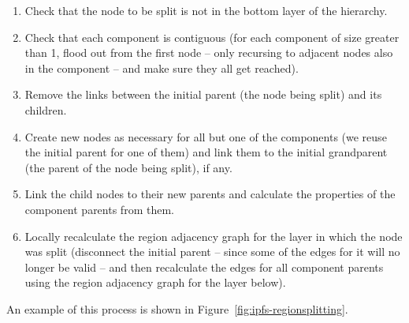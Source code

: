 \begin{enumerate}

\item Check that the node to be split is not in the bottom layer of the hierarchy.
\item Check that each component is contiguous (for each component of size greater than 1, flood out from the first node -- only recursing to adjacent nodes also in the component -- and make sure they all get reached).
\item Remove the links between the initial parent (the node being split) and its children.
\item Create new nodes as necessary for all but one of the components (we reuse the initial parent for one of them) and link them to the initial grandparent (the parent of the node being split), if any.
\item Link the child nodes to their new parents and calculate the properties of the component parents from them.
\item Locally recalculate the region adjacency graph for the layer in which the node was split (disconnect the initial parent -- since some of the edges for it will no longer be valid -- and then recalculate the edges for all component parents using the region adjacency graph for the layer below).

\end{enumerate}

\noindent An example of this process is shown in Figure~\ref{fig:ipfs-regionsplitting}.

